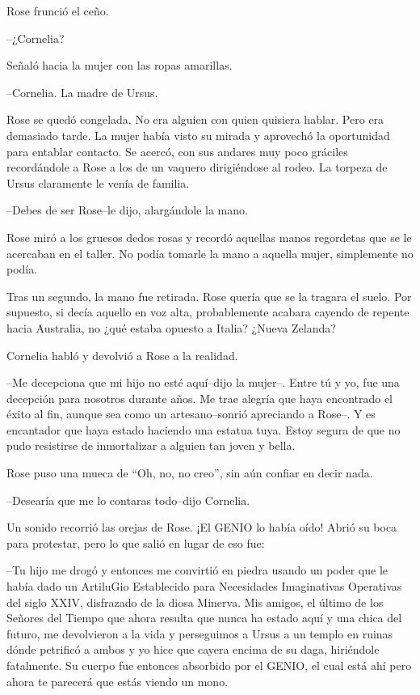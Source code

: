 Rose frunció el ceño.

--¿Cornelia?

Señaló hacia la mujer con las ropas amarillas.

--Cornelia. La madre de Ursus.

Rose se quedó congelada. No era alguien con quien quisiera hablar. Pero
era demasiado tarde. La mujer había visto su mirada y aprovechó la
oportunidad para entablar contacto. Se acercó, con sus andares muy poco
gráciles recordándole a Rose a los de un vaquero dirigiéndose al rodeo.
La torpeza de Ursus claramente le venía de familia.

--Debes de ser Rose--le dijo, alargándole la mano.

Rose miró a los gruesos dedos rosas y recordó aquellas manos regordetas
que se le acercaban en el taller. No podía tomarle la mano a aquella
mujer, simplemente no podía.

Tras un segundo, la mano fue retirada. Rose quería que se la tragara el
suelo. Por supuesto, si decía aquello en voz alta, probablemente acabara
cayendo de repente hacia Australia, no ¿qué estaba opuesto a Italia?
¿Nueva Zelanda?

Cornelia habló y devolvió a Rose a la realidad.

--Me decepciona que mi hijo no esté aquí--dijo la mujer--. Entre tú y
yo, fue una decepción para nosotros durante años. Me trae alegría que
haya encontrado el éxito al fin, aunque sea como un artesano--sonrió
apreciando a Rose--. Y es encantador que haya estado haciendo una
estatua tuya. Estoy segura de que no pudo resistirse de inmortalizar a
alguien tan joven y bella.

Rose puso una mueca de ``Oh, no, no creo'', sin aún confiar en decir
nada.

--Desearía que me lo contaras todo--dijo Cornelia.

Un sonido recorrió las orejas de Rose. ¡El GENIO lo había oído! Abrió su
boca para protestar, pero lo que salió en lugar de eso fue:

--Tu hijo me drogó y entonces me convirtió en piedra usando un poder que
le había dado un ArtiluGio Establecido para Necesidades Imaginativas
Operativas del siglo XXIV, disfrazado de la diosa Minerva. Mis amigos,
el último de los Señores del Tiempo que ahora resulta que nunca ha
estado aquí y una chica del futuro, me devolvieron a la vida y
perseguimos a Ursus a un templo en ruinas dónde petrificó a ambos y yo
hice que cayera encima de su daga, hiriéndole fatalmente. Su cuerpo fue
entonces absorbido por el GENIO, el cual está ahí pero ahora te parecerá
que estás viendo un mono.

